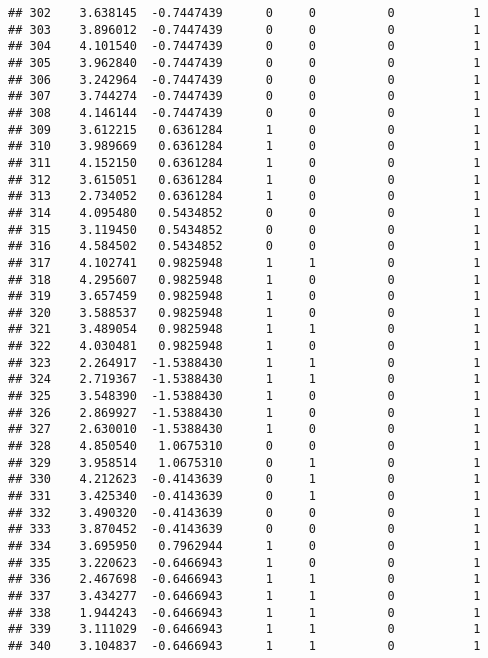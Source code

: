 \documentclass[
]{article}
\begin{document}
\begin{verbatim}
## 302    3.638145  -0.7447439      0     0          0           1
## 303    3.896012  -0.7447439      0     0          0           1
## 304    4.101540  -0.7447439      0     0          0           1
## 305    3.962840  -0.7447439      0     0          0           1
## 306    3.242964  -0.7447439      0     0          0           1
## 307    3.744274  -0.7447439      0     0          0           1
## 308    4.146144  -0.7447439      0     0          0           1
## 309    3.612215   0.6361284      1     0          0           1
## 310    3.989669   0.6361284      1     0          0           1
## 311    4.152150   0.6361284      1     0          0           1
## 312    3.615051   0.6361284      1     0          0           1
## 313    2.734052   0.6361284      1     0          0           1
## 314    4.095480   0.5434852      0     0          0           1
## 315    3.119450   0.5434852      0     0          0           1
## 316    4.584502   0.5434852      0     0          0           1
## 317    4.102741   0.9825948      1     1          0           1
## 318    4.295607   0.9825948      1     0          0           1
## 319    3.657459   0.9825948      1     0          0           1
## 320    3.588537   0.9825948      1     0          0           1
## 321    3.489054   0.9825948      1     1          0           1
## 322    4.030481   0.9825948      1     0          0           1
## 323    2.264917  -1.5388430      1     1          0           1
## 324    2.719367  -1.5388430      1     1          0           1
## 325    3.548390  -1.5388430      1     0          0           1
## 326    2.869927  -1.5388430      1     0          0           1
## 327    2.630010  -1.5388430      1     0          0           1
## 328    4.850540   1.0675310      0     0          0           1
## 329    3.958514   1.0675310      0     1          0           1
## 330    4.212623  -0.4143639      0     1          0           1
## 331    3.425340  -0.4143639      0     1          0           1
## 332    3.490320  -0.4143639      0     0          0           1
## 333    3.870452  -0.4143639      0     0          0           1
## 334    3.695950   0.7962944      1     0          0           1
## 335    3.220623  -0.6466943      1     0          0           1
## 336    2.467698  -0.6466943      1     1          0           1
## 337    3.434277  -0.6466943      1     1          0           1
## 338    1.944243  -0.6466943      1     1          0           1
## 339    3.111029  -0.6466943      1     1          0           1
## 340    3.104837  -0.6466943      1     1          0           1

\end{verbatim}
\end{document}
